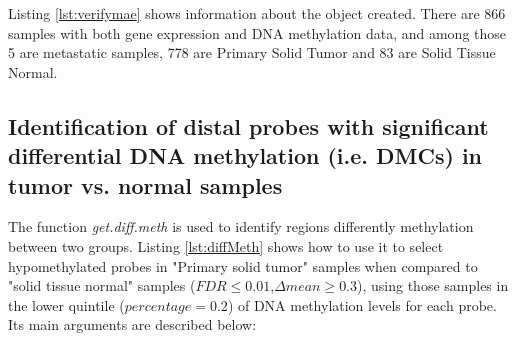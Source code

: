 

Listing \ref{lst:verifymae} shows information about the object created.
There are 866 samples with both gene expression and DNA methylation data,
and among those 5 are metastatic samples, 778 are Primary Solid Tumor and
83 are Solid Tissue Normal.





\subsection*{Identification of distal probes with significant differential DNA methylation (i.e. DMCs) in tumor vs. normal samples}

The function \textit{get.diff.meth} is  used to identify regions differently methylation between two groups.  Listing \ref{lst:diffMeth} shows how to use it to select hypomethylated probes in "Primary solid tumor" samples when compared to "solid tissue normal" samples  ($FDR \leq 0.01$,$\Delta mean \geq 0.3$), using those samples in the lower quintile ($percentage = 0.2$) of DNA methylation levels for each probe. Its main arguments are described below:



